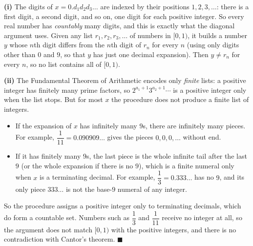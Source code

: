 \textbf{(i)} The digits of $x=0.d_1d_2d_3\dots$ are indexed by their positions $1,2,3,\dots$: there is a first digit, a second digit, and so on, one digit for each positive integer. So every real number has \emph{countably} many digits, and this is exactly what the diagonal argument uses. Given any list $r_1,r_2,r_3,\dots$ of numbers in $[0,1)$, it builds a number $y$ whose $n$th digit differs from the $n$th digit of $r_n$ for every $n$ (using only digits other than $0$ and $9$, so that $y$ has just one decimal expansion). Then $y\ne r_n$ for every $n$, so no list contains all of $[0,1)$.

\textbf{(ii)} The Fundamental Theorem of Arithmetic encodes only \emph{finite} lists: a positive integer has finitely many prime factors, so $2^{a_1+1}3^{a_2+1}\cdots$ is a positive integer only when the list stops. But for most $x$ the procedure does not produce a finite list of integers.
\begin{itemize}
\item If the expansion of $x$ has infinitely many $9$s, there are infinitely many pieces. For example, $\dfrac1{11}=0.090909\dots$ gives the pieces $0,0,0,\dots$ without end.
\item If it has finitely many $9$s, the last piece is the whole infinite tail after the last $9$ (or the whole expansion if there is no $9$), which is a finite numeral only when $x$ is a terminating decimal. For example, $\dfrac13=0.333\dots$ has no $9$, and its only piece $333\dots$ is not the base-$9$ numeral of any integer.
\end{itemize}
So the procedure assigns a positive integer only to terminating decimals, which do form a countable set. Numbers such as $\dfrac13$ and $\dfrac1{11}$ receive no integer at all, so the argument does not match $[0,1)$ with the positive integers, and there is no contradiction with Cantor's theorem. $\blacksquare$

